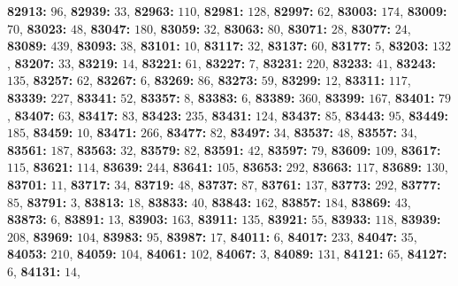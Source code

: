 \textsf{\bfseries 82913:} $96$, \textsf{\bfseries 82939:} $33$, \textsf{\bfseries 82963:} $110$, \textsf{\bfseries 82981:} $128$, \textsf{\bfseries 82997:} $62$, \textsf{\bfseries 83003:} $174$, \textsf{\bfseries 83009:} $70$, \textsf{\bfseries 83023:} $48$, \textsf{\bfseries 83047:} $180$, \textsf{\bfseries 83059:} $32$, \textsf{\bfseries 83063:} $80$, \textsf{\bfseries 83071:} $28$, \textsf{\bfseries 83077:} $24$, \textsf{\bfseries 83089:} $439$, \textsf{\bfseries 83093:} $38$, \textsf{\bfseries 83101:} $10$, \textsf{\bfseries 83117:} $32$, \textsf{\bfseries 83137:} $60$, \textsf{\bfseries 83177:} $5$, \textsf{\bfseries 83203:} $132$, \textsf{\bfseries 83207:} $33$, \textsf{\bfseries 83219:} $14$, \textsf{\bfseries 83221:} $61$, \textsf{\bfseries 83227:} $7$, \textsf{\bfseries 83231:} $220$, \textsf{\bfseries 83233:} $41$, \textsf{\bfseries 83243:} $135$, \textsf{\bfseries 83257:} $62$, \textsf{\bfseries 83267:} $6$, \textsf{\bfseries 83269:} $86$, \textsf{\bfseries 83273:} $59$, \textsf{\bfseries 83299:} $12$, \textsf{\bfseries 83311:} $117$, \textsf{\bfseries 83339:} $227$, \textsf{\bfseries 83341:} $52$, \textsf{\bfseries 83357:} $8$, \textsf{\bfseries 83383:} $6$, \textsf{\bfseries 83389:} $360$, \textsf{\bfseries 83399:} $167$, \textsf{\bfseries 83401:} $79$, \textsf{\bfseries 83407:} $63$, \textsf{\bfseries 83417:} $83$, \textsf{\bfseries 83423:} $235$, \textsf{\bfseries 83431:} $124$, \textsf{\bfseries 83437:} $85$, \textsf{\bfseries 83443:} $95$, \textsf{\bfseries 83449:} $185$, \textsf{\bfseries 83459:} $10$, \textsf{\bfseries 83471:} $266$, \textsf{\bfseries 83477:} $82$, \textsf{\bfseries 83497:} $34$, \textsf{\bfseries 83537:} $48$, \textsf{\bfseries 83557:} $34$, \textsf{\bfseries 83561:} $187$, \textsf{\bfseries 83563:} $32$, \textsf{\bfseries 83579:} $82$, \textsf{\bfseries 83591:} $42$, \textsf{\bfseries 83597:} $79$, \textsf{\bfseries 83609:} $109$, \textsf{\bfseries 83617:} $115$, \textsf{\bfseries 83621:} $114$, \textsf{\bfseries 83639:} $244$, \textsf{\bfseries 83641:} $105$, \textsf{\bfseries 83653:} $292$, \textsf{\bfseries 83663:} $117$, \textsf{\bfseries 83689:} $130$, \textsf{\bfseries 83701:} $11$, \textsf{\bfseries 83717:} $34$, \textsf{\bfseries 83719:} $48$, \textsf{\bfseries 83737:} $87$, \textsf{\bfseries 83761:} $137$, \textsf{\bfseries 83773:} $292$, \textsf{\bfseries 83777:} $85$, \textsf{\bfseries 83791:} $3$, \textsf{\bfseries 83813:} $18$, \textsf{\bfseries 83833:} $40$, \textsf{\bfseries 83843:} $162$, \textsf{\bfseries 83857:} $184$, \textsf{\bfseries 83869:} $43$, \textsf{\bfseries 83873:} $6$, \textsf{\bfseries 83891:} $13$, \textsf{\bfseries 83903:} $163$, \textsf{\bfseries 83911:} $135$, \textsf{\bfseries 83921:} $55$, \textsf{\bfseries 83933:} $118$, \textsf{\bfseries 83939:} $208$, \textsf{\bfseries 83969:} $104$, \textsf{\bfseries 83983:} $95$, \textsf{\bfseries 83987:} $17$, \textsf{\bfseries 84011:} $6$, \textsf{\bfseries 84017:} $233$, \textsf{\bfseries 84047:} $35$, \textsf{\bfseries 84053:} $210$, \textsf{\bfseries 84059:} $104$, \textsf{\bfseries 84061:} $102$, \textsf{\bfseries 84067:} $3$, \textsf{\bfseries 84089:} $131$, \textsf{\bfseries 84121:} $65$, \textsf{\bfseries 84127:} $6$, \textsf{\bfseries 84131:} $14$, 
